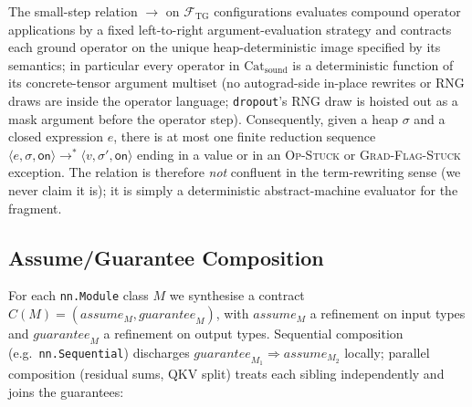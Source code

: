 \begin{definition}
\label{def:det-eval}
The small-step relation $\to$ on $\mathcal{F}_{\mathrm{TG}}$
configurations evaluates compound operator applications by a
fixed left-to-right argument-evaluation strategy and contracts
each ground operator on the unique heap-deterministic image
specified by its semantics; in particular every operator in
$\mathrm{Cat}_{\mathrm{sound}}$ is a deterministic function of
its concrete-tensor argument multiset (no autograd-side
in-place rewrites or RNG draws are inside the operator
language; \texttt{dropout}'s RNG draw is hoisted out as a
mask argument before the operator step). Consequently, given a
heap $\sigma$ and a closed expression $e$, there is at most
one finite reduction sequence $\langle e,\sigma,\mathsf{on}\rangle
\to^*\langle v,\sigma',\mathsf{on}\rangle$ ending in a value
or in an \textsc{Op-Stuck} or \textsc{Grad-Flag-Stuck}
exception. The relation is therefore \emph{not} confluent in
the term-rewriting sense (we never claim it is); it is simply
a deterministic abstract-machine evaluator for the fragment.
\end{definition}

\subsection{Assume/Guarantee Composition}
\label{sec:assume-guarantee}

For each \texttt{nn.Module} class $M$ we synthesise a contract
$C(M)=(\mathit{assume}_M,\mathit{guarantee}_M)$, with
$\mathit{assume}_M$ a refinement on input types and
$\mathit{guarantee}_M$ a refinement on output types. Sequential
composition (e.g.\ \texttt{nn.Sequential}) discharges
$\mathit{guarantee}_{M_1}\!\Rightarrow\!\mathit{assume}_{M_2}$
locally; parallel composition (residual sums, QKV split) treats
each sibling independently and joins the guarantees:

{\small
{}}

